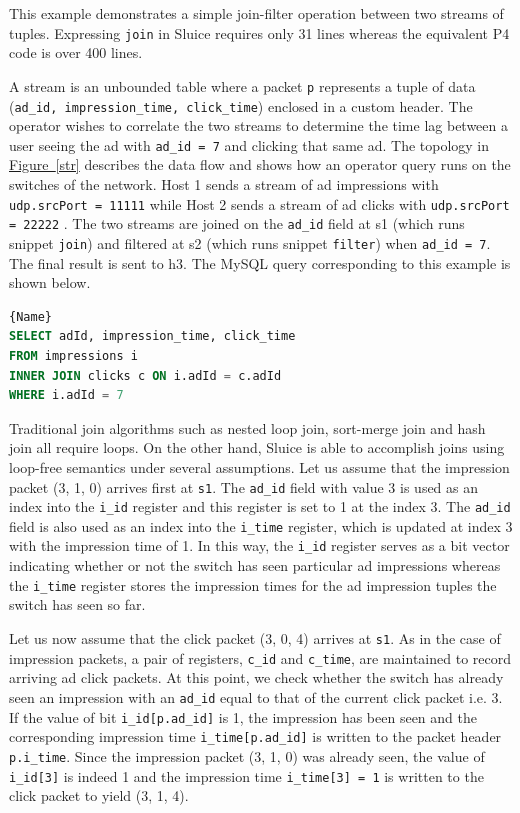\documentclass[12pt, oneside]{article}
\newcommand{\irref}[2]{\hyperref[#2]{#1~\ref{#2}}}
\begin{document}
This example demonstrates a simple join-filter operation between two streams of
tuples. Expressing \texttt{join} in Sluice requires only 31 lines whereas the equivalent P4 code is over 400 lines. 

A stream is an unbounded table where a packet \texttt{p} represents a tuple of
data (\texttt{ad\_id, impression\_time, click\_time}) enclosed in a custom
header. The operator wishes to correlate the two streams to determine the time lag between a user seeing the ad with \texttt{ad\_id = 7} and clicking that same ad. The topology in \irref{Figure}{str} describes the data flow and shows how an
operator query runs on the switches of the network. Host 1 sends a stream of ad
impressions with \texttt{udp.srcPort = 11111} while Host 2 sends a stream of ad clicks with \texttt{udp.srcPort = 22222} . The two streams are
joined on the \texttt{ad\_id} field at s1 (which runs snippet \texttt{join}) and filtered at s2 (which runs snippet \texttt{filter}) when \texttt{ad\_id = 7}. The final result is sent to h3. The MySQL query corresponding to this example is shown below.

\begin{lstlisting}[frame=tlrb, language = SQL, basicstyle=\linespread{1.3}\scriptsize]{Name}
SELECT adId, impression_time, click_time 
FROM impressions i 
INNER JOIN clicks c ON i.adId = c.adId
WHERE i.adId = 7
\end{lstlisting}

Traditional join algorithms such as nested loop join, sort-merge join and hash join all require loops. On the other hand, Sluice is able to accomplish joins using loop-free semantics under several assumptions. Let us assume that the impression packet (3, 1, 0) arrives first at \texttt{s1}. The \texttt{ad\_id} field with value 3 is used as an index into the \texttt{i\_id} register and this register is set to 1 at the index 3. The \texttt{ad\_id} field is also used as an index into the \texttt{i\_time} register, which is updated at index 3 with the impression time of 1. In this way, the \texttt{i\_id} register serves as a bit vector indicating whether or not the switch has seen particular ad impressions whereas the \texttt{i\_time} register stores the impression times for the ad impression tuples the switch has seen so far. 

Let us now assume that the click packet (3, 0, 4) arrives at \texttt{s1}. As in the case of impression packets, a pair of registers, \texttt{c\_id} and \texttt{c\_time}, are maintained to record arriving ad click packets. At this point, we check whether the switch has already seen an impression with an \texttt{ad\_id} equal to that of the current click packet i.e. 3. If the value of bit \texttt{i\_id[p.ad\_id]} is 1, the impression has been seen and the corresponding impression time \texttt{i\_time[p.ad\_id]} is written to the packet header \texttt{p.i\_time}. Since the impression packet (3, 1, 0) was already seen, the value of \texttt{i\_id[3]} is indeed 1 and the impression time \texttt{i\_time[3] = 1} is written to the click packet to yield (3, 1, 4). 
\end{document}
